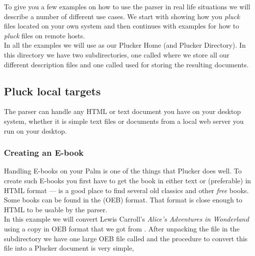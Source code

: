 To give you a few examples on how to use the parser in real life
situations we will describe a number of different use cases. We
start with showing how you \emph{pluck} files located on your own
system and then continues with examples for how to \emph{pluck}
files on remote hosts.\\

In all the examples we will use  as
our Plucker Home (and Plucker Directory). In this directory we
have two subdirectories, one called  where we store
all our different description files and one called 
used for storing the resulting documents.

\subsection{Pluck local targets}

The parser can handle any HTML or text document you have on your
desktop system, whether it is simple text files or documents from
a local web server you run on your desktop.

\subsubsection{Creating an E-book}

Handling E-books on your Palm is one of the things that Plucker does
well. To create such E-books you first have to get the book in either
text or (preferable) in HTML format --- 
is a good place to find several old classics and other \emph{free} books.
Some books can be found in the  (OEB) format. That
format is close enough to HTML to be usable by the parser.\\

In this example we will convert Lewis Carroll's \emph{Alice's Adventures
in Wonderland} using a copy in OEB format that we got from
. After
unpacking the file in the  subdirectory we have one large
OEB file called  and the
procedure to convert this file into a Plucker document is very simple,\\

